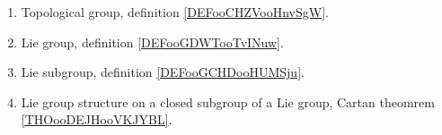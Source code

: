 
	\label{THEMEooLieGroups}
\begin{enumerate}
	\item
	      Topological group, definition \ref{DEFooCHZVooHnvSgW}.
	\item
	      Lie group, definition \ref{DEFooGDWTooTvINuw}.
	\item
	      Lie subgroup, definition \ref{DEFooGCHDooHUMSju}.
	\item
	      Lie group structure on a closed subgroup of a Lie group, Cartan theomrem \ref{THOooDEJHooVKJYBL}.
\end{enumerate}

